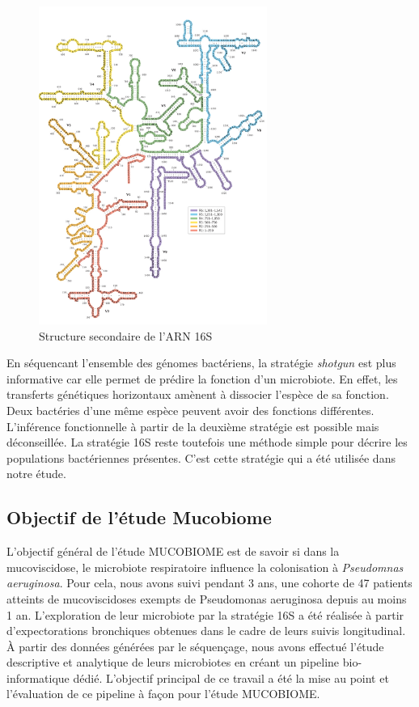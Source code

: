 \documentclass[12pt,a4paper]{article}
\begin{document}
\begin{figure}[ht]
\begin{center}
\includegraphics[scale=0.8]{img/ARN_16S.png}\hfill
\end{center}
\caption{Structure secondaire de l'ARN 16S}
\label{ARN16S}
\end{figure}


En séquencant l'ensemble des génomes bactériens, la stratégie \textit{shotgun} est plus informative car elle permet de prédire la fonction d'un microbiote. En effet, les transferts génétiques horizontaux amènent à dissocier l'espèce de sa fonction. Deux bactéries d'une même espèce peuvent avoir des fonctions différentes. L'inférence fonctionnelle à partir de la deuxième stratégie est possible mais déconseillée.  
La stratégie 16S reste toutefois une méthode simple pour décrire les populations bactériennes présentes. C'est cette stratégie qui a été utilisée dans notre étude. 



\subsection{Objectif de l'étude Mucobiome}
L'objectif général de l'étude MUCOBIOME est de savoir si dans la mucoviscidose, le microbiote respiratoire influence la colonisation à \textit{Pseudomnas aeruginosa}. 
Pour cela, nous avons suivi pendant 3 ans,  une cohorte de 47 patients atteints de mucoviscidoses exempts de Pseudomonas aeruginosa depuis au moins 1 an.
L'exploration de leur microbiote par la stratégie 16S a été réalisée à partir d'expectorations bronchiques obtenues dans le cadre de leurs suivis longitudinal. 
À partir des données générées par le séquençage, nous avons effectué l'étude descriptive et analytique de leurs microbiotes en créant un pipeline bio-informatique dédié. L'objectif principal de ce travail a été la mise au point et l'évaluation de ce pipeline à façon pour l'étude MUCOBIOME.
\end{document}
